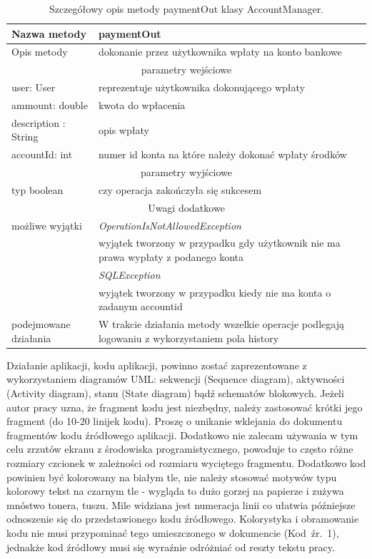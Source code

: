 \documentclass[12pt,a4paper]{article}
\begin{document}
\begin{table}[!h]
\begin{center}
\begin{tabularx}{\textwidth}{|l|X|}
  \hline
  Nazwa metody  & paymentOut  \\\hline
  Opis metody   & dokonanie przez użytkownika wpłaty na konto bankowe\\\hline\hline
  \multicolumn{2}{|c|}{parametry wejściowe} \\\hline
  user: User            &  reprezentuje użytkownika dokonującego wpłaty  \\\hline
  ammount: double       &  kwota do wpłacenia  \\\hline
  description : String  & opis wpłaty \\\hline
  accountId: int        & numer id konta na które należy dokonać wpłaty środków \\\hline\hline
  \multicolumn{2}{|c|}{parametry wyjściowe}   \\\hline
  typ boolean &  czy operacja zakończyła się sukcesem\\\hline\hline
  \multicolumn{2}{|c|}{Uwagi dodatkowe}\\\hline
  możliwe wyjątki   & \textit{OperationIsNotAllowedException} \\
                    & wyjątek tworzony w przypadku gdy użytkownik nie ma prawa wypłaty z podanego konta\\
                    & \textit{SQLException}\\
                    & wyjątek tworzony w przypadku kiedy nie ma  konta o zadanym accountid\\\hline
  podejmowane działania & W trakcie działania metody wszelkie operacje  podlegają logowaniu z wykorzystaniem pola history\\
  \hline
\end{tabularx}
\caption{Szczegółowy opis metody paymentOut klasy AccountManager.}\label{Opis_Klasy}
\end{center}
\end{table}

Działanie aplikacji, kodu aplikacji, powinno zostać zaprezentowane z wykorzystaniem diagramów UML\cite{UML}: sekwencji (Sequence diagram), aktywności (Activity diagram), stanu (State diagram) bądź schematów blokowych.  Jeżeli autor pracy uzna, że fragment kodu jest niezbędny, należy zastosować krótki jego fragment (do 10-20 linijek kodu). Proszę o unikanie wklejania do dokumentu fragmentów kodu źródłowego aplikacji. Dodatkowo nie zalecam używania w tym celu zrzutów ekranu z środowiska programistycznego, powoduje to często różne rozmiary czcionek w zależności od rozmiaru wyciętego fragmentu. Dodatkowo kod powinien być kolorowany na białym tle, nie należy stosować motywów typu kolorowy tekst na czarnym tle - wygląda to dużo gorzej na papierze i zużywa mnóstwo tonera, tuszu. Mile widziana jest numeracja linii co ułatwia późniejsze odnoszenie się do przedstawionego kodu źródłowego. Kolorystyka i obramowanie kodu nie musi przypominać tego umieszczonego w dokumencie (Kod~źr.~1), jednakże kod źródłowy musi się wyraźnie odróżniać od reszty tekstu pracy.
\end{document}
